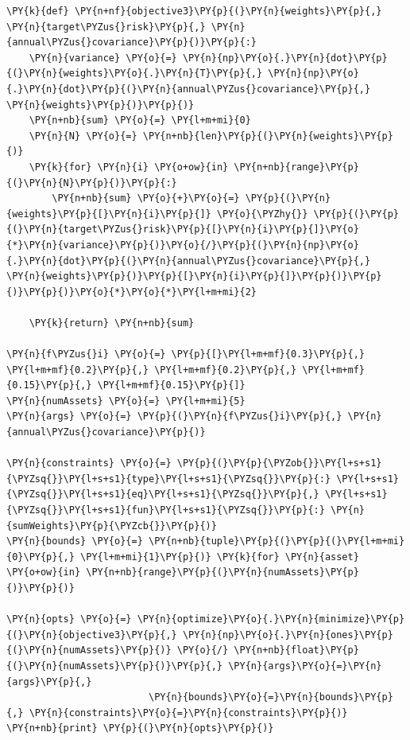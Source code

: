     \begin{tcolorbox}[breakable, size=fbox, boxrule=1pt, pad at break*=1mm,colback=cellbackground, colframe=cellborder]
\begin{Verbatim}[commandchars=\\\{\}]
\PY{k}{def} \PY{n+nf}{objective3}\PY{p}{(}\PY{n}{weights}\PY{p}{,} \PY{n}{target\PYZus{}risk}\PY{p}{,} \PY{n}{annual\PYZus{}covariance}\PY{p}{)}\PY{p}{:}
    \PY{n}{variance} \PY{o}{=} \PY{n}{np}\PY{o}{.}\PY{n}{dot}\PY{p}{(}\PY{n}{weights}\PY{o}{.}\PY{n}{T}\PY{p}{,} \PY{n}{np}\PY{o}{.}\PY{n}{dot}\PY{p}{(}\PY{n}{annual\PYZus{}covariance}\PY{p}{,} \PY{n}{weights}\PY{p}{)}\PY{p}{)}
    \PY{n+nb}{sum} \PY{o}{=} \PY{l+m+mi}{0}
    \PY{n}{N} \PY{o}{=} \PY{n+nb}{len}\PY{p}{(}\PY{n}{weights}\PY{p}{)}
    \PY{k}{for} \PY{n}{i} \PY{o+ow}{in} \PY{n+nb}{range}\PY{p}{(}\PY{n}{N}\PY{p}{)}\PY{p}{:}
        \PY{n+nb}{sum} \PY{o}{+}\PY{o}{=} \PY{p}{(}\PY{n}{weights}\PY{p}{[}\PY{n}{i}\PY{p}{]} \PY{o}{\PYZhy{}} \PY{p}{(}\PY{p}{(}\PY{n}{target\PYZus{}risk}\PY{p}{[}\PY{n}{i}\PY{p}{]}\PY{o}{*}\PY{n}{variance}\PY{p}{)}\PY{o}{/}\PY{p}{(}\PY{n}{np}\PY{o}{.}\PY{n}{dot}\PY{p}{(}\PY{n}{annual\PYZus{}covariance}\PY{p}{,} \PY{n}{weights}\PY{p}{)}\PY{p}{[}\PY{n}{i}\PY{p}{]}\PY{p}{)}\PY{p}{)}\PY{p}{)}\PY{o}{*}\PY{o}{*}\PY{l+m+mi}{2}
        
    \PY{k}{return} \PY{n+nb}{sum}

\PY{n}{f\PYZus{}i} \PY{o}{=} \PY{p}{[}\PY{l+m+mf}{0.3}\PY{p}{,} \PY{l+m+mf}{0.2}\PY{p}{,} \PY{l+m+mf}{0.2}\PY{p}{,} \PY{l+m+mf}{0.15}\PY{p}{,} \PY{l+m+mf}{0.15}\PY{p}{]}
\PY{n}{numAssets} \PY{o}{=} \PY{l+m+mi}{5}
\PY{n}{args} \PY{o}{=} \PY{p}{(}\PY{n}{f\PYZus{}i}\PY{p}{,} \PY{n}{annual\PYZus{}covariance}\PY{p}{)}

\PY{n}{constraints} \PY{o}{=} \PY{p}{(}\PY{p}{\PYZob{}}\PY{l+s+s1}{\PYZsq{}}\PY{l+s+s1}{type}\PY{l+s+s1}{\PYZsq{}}\PY{p}{:} \PY{l+s+s1}{\PYZsq{}}\PY{l+s+s1}{eq}\PY{l+s+s1}{\PYZsq{}}\PY{p}{,} \PY{l+s+s1}{\PYZsq{}}\PY{l+s+s1}{fun}\PY{l+s+s1}{\PYZsq{}}\PY{p}{:} \PY{n}{sumWeights}\PY{p}{\PYZcb{}}\PY{p}{)}
\PY{n}{bounds} \PY{o}{=} \PY{n+nb}{tuple}\PY{p}{(}\PY{p}{(}\PY{l+m+mi}{0}\PY{p}{,} \PY{l+m+mi}{1}\PY{p}{)} \PY{k}{for} \PY{n}{asset} \PY{o+ow}{in} \PY{n+nb}{range}\PY{p}{(}\PY{n}{numAssets}\PY{p}{)}\PY{p}{)}

\PY{n}{opts} \PY{o}{=} \PY{n}{optimize}\PY{o}{.}\PY{n}{minimize}\PY{p}{(}\PY{n}{objective3}\PY{p}{,} \PY{n}{np}\PY{o}{.}\PY{n}{ones}\PY{p}{(}\PY{n}{numAssets}\PY{p}{)} \PY{o}{/} \PY{n+nb}{float}\PY{p}{(}\PY{n}{numAssets}\PY{p}{)}\PY{p}{,} \PY{n}{args}\PY{o}{=}\PY{n}{args}\PY{p}{,}
                         \PY{n}{bounds}\PY{o}{=}\PY{n}{bounds}\PY{p}{,} \PY{n}{constraints}\PY{o}{=}\PY{n}{constraints}\PY{p}{)}
\PY{n+nb}{print} \PY{p}{(}\PY{n}{opts}\PY{p}{)}  


\end{Verbatim}
\end{tcolorbox}
